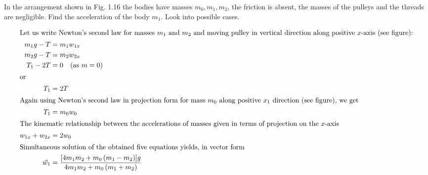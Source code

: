 \item In the arrangement shown in Fig. 1.16 the bodies have masses \( m_0, m_1, m_2 \), the friction is absent, the masses of the pulleys and the threads are negligible. Find the acceleration of the body \( m_1 \). Look into possible cases.
    \begin{center}
    \end{center}

\begin{solution}
    \begin{center}
    \end{center}
    
    \begin{align*}
        \intertext{Let us write Newton’s second law for masses \(m_1\) and \(m_2\) and moving pulley in vertical direction along positive \(x\)-axis (see figure):}
        m_1g - T &= m_1w_{1x} \\
        m_2g - T &= m_2w_{2x} \\
        T_1 - 2T &= 0 \quad (\text{as } m = 0)\\
        \intertext{or}
        T_1 &= 2T \\
        \intertext{Again using Newton’s second law in projection form for mass \(m_0\) along positive \(x_1\) direction (see figure), we get}
        T_1 &= m_0w_0 \\
        \intertext{The kinematic relationship between the accelerations of masses given in terms of projection on the \(x\)-axis}
        w_{1x} + w_{2x} &= 2w_0 \\
        \intertext{Simultaneous solution of the obtained five equations yields, in vector form}
        \vec{w}_1 &= \dfrac{[4m_1m_2 + m_0 \left(m_1 - m_2\right)]g}{4m_1m_2 + m_0\left(m_1 + m_2\right)}
    \end{align*}
\end{solution}
